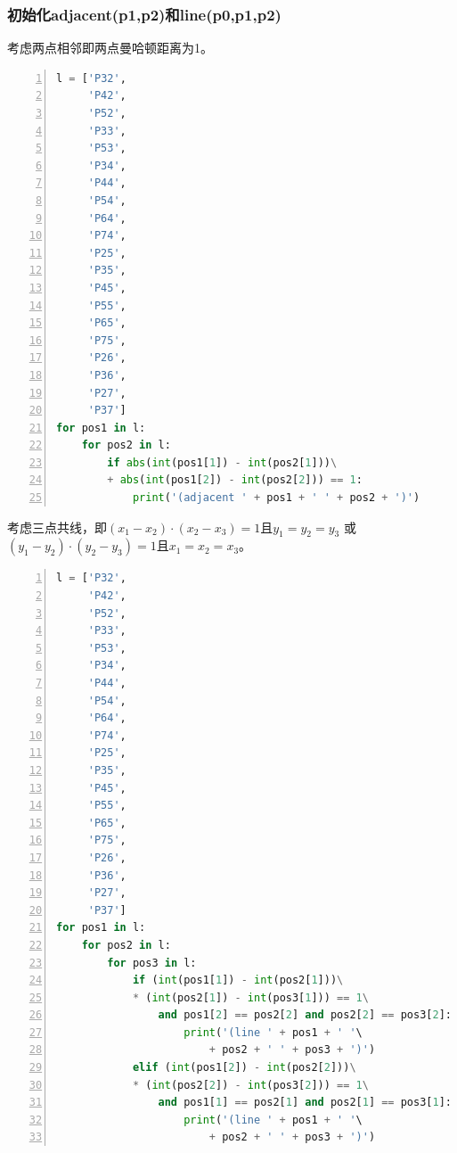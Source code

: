 \documentclass[a4paper, 11pt]{article}
\begin{document}
\subsubsection{初始化adjacent(p1,p2)和line(p0,p1,p2)}
考虑两点相邻即两点曼哈顿距离为1。
\begin{lstlisting}[title=adjacent.py,frame=single,language=python,numbers=left]
l = ['P32',
     'P42',
     'P52',
     'P33',
     'P53',
     'P34',
     'P44',
     'P54',
     'P64',
     'P74',
     'P25',
     'P35',
     'P45',
     'P55',
     'P65',
     'P75',
     'P26',
     'P36',
     'P27',
     'P37']
for pos1 in l:
    for pos2 in l:
        if abs(int(pos1[1]) - int(pos2[1]))\
        + abs(int(pos1[2]) - int(pos2[2])) == 1:
            print('(adjacent ' + pos1 + ' ' + pos2 + ')')
\end{lstlisting}
考虑三点共线，即$(x_1-x_2)\cdot(x_2-x_3)=1$且$y_1=y_2=y_3$
或$(y_1-y_2)\cdot(y_2-y_3)=1$且$x_1=x_2=x_3$。
\begin{lstlisting}[title=line.py,frame=single,language=python,numbers=left]
l = ['P32',
     'P42',
     'P52',
     'P33',
     'P53',
     'P34',
     'P44',
     'P54',
     'P64',
     'P74',
     'P25',
     'P35',
     'P45',
     'P55',
     'P65',
     'P75',
     'P26',
     'P36',
     'P27',
     'P37']
for pos1 in l:
    for pos2 in l:
        for pos3 in l:
            if (int(pos1[1]) - int(pos2[1]))\
            * (int(pos2[1]) - int(pos3[1])) == 1\
                and pos1[2] == pos2[2] and pos2[2] == pos3[2]:
                    print('(line ' + pos1 + ' '\
                        + pos2 + ' ' + pos3 + ')')
            elif (int(pos1[2]) - int(pos2[2]))\
            * (int(pos2[2]) - int(pos3[2])) == 1\
                and pos1[1] == pos2[1] and pos2[1] == pos3[1]:
                    print('(line ' + pos1 + ' '\
                        + pos2 + ' ' + pos3 + ')')
\end{lstlisting}
\end{document}
